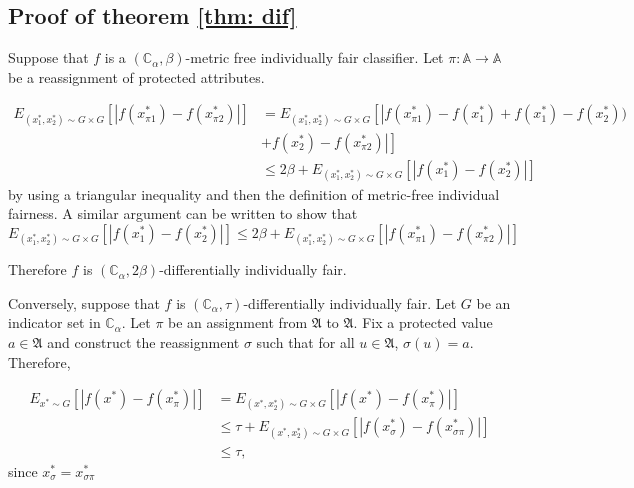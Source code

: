 \documentclass{article}
\begin{document}
\subsection{Proof of theorem \ref{thm: dif}}
Suppose that $f$ is a $(\mathbb{C}_{\alpha}, \beta)$-metric free individually fair classifier. Let $\pi: \mathbb{A} \rightarrow \mathbb{A}$ be a reassignment of protected attributes.

\begin{equation}
\begin{split}
    E_{(x^{*}_{1}, x^{*}_{2})\sim G \times G}\left[\left|f(x_{\pi1}^{*}) - f(x_{\pi2}^{*})\right|\right]  & = E_{(x^{*}_{1}, x^{*}_{2})\sim G \times G}\left[\left|f(x_{\pi1}^{*}) - f(x_{1}^{*}) + f(x_{1}^{*}) - f(x_{2}^{*}))\right.\right. \\
    & + \left.\left. f(x^{*}_{2}) - f(x_{\pi2}^{*})\right|\right] \\
    & \leq 2\beta + E_{(x^{*}_{1}, x^{*}_{2})\sim G \times G}\left[\left|f(x_{1}^{*}) - f(x_{2}^{*})\right|\right] 
    \end{split}
\end{equation}
by using a triangular inequality and then the definition of metric-free individual fairness. A similar argument can be written to show that  
\begin{equation}
    E_{(x^{*}_{1}, x^{*}_{2})\sim G \times G}\left[\left|f(x_{1}^{*}) - f(x_{2}^{*})\right|\right] \leq 2\beta +  E_{(x^{*}_{1}, x^{*}_{2})\sim G \times G}\left[\left|f(x_{\pi1}^{*}) - f(x_{\pi2}^{*})\right|\right]
\end{equation}

Therefore $f$ is $(\mathbb{C}_{\alpha}, 2\beta)$-differentially individually fair.

\bigskip
Conversely, suppose that $f$ is $(\mathbb{C}_{\alpha}, \tau)$-differentially individually fair. Let $G$ be an indicator set in $\mathbb{C}_{\alpha}$. Let $\pi$ be an assignment from $\mathfrak{A}$ to $\mathfrak{A}$. Fix a protected value $a\in \mathfrak{A}$ and construct  the reassignment $\sigma$ such that for all $u\in \mathfrak{A}$, $\sigma(u)=a$. Therefore,
 
\begin{equation}
\begin{split}
    E_{x^{*}\sim G}\left[\left|f(x^{*}) - f(x^{*}_{\pi})\right|\right]  & = E_{(x^{*}, x_{2}^{*})\sim G \times G}\left[\left|f(x^{*}) - f(x^{*}_{\pi})\right|\right] \\
    & \leq  \tau +  E_{(x^{*}, x_{2}^{*})\sim G \times G}\left[\left|f(x^{*}_{\sigma}) - f(x^{*}_{\sigma\pi})\right|\right]  \\
    & \leq \tau,
    \end{split}
\end{equation}
since $x^{*}_{\sigma} = x^{*}_{\sigma\pi}$
\end{document}
